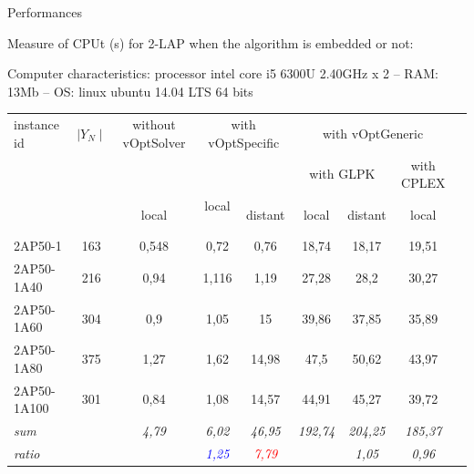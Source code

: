 \documentclass[10pt,xcolor=dvipsnames]{beamer}
\newcommand{\red}{\textcolor{red}}
\newcommand{\blue}{\textcolor{blue}}
\begin{document}
\begin{frame}{Performances}

\vspace{2mm}

Measure of CPUt (s) for 2-LAP when the algorithm is embedded or not:
\vspace{2mm}

{\tiny
Computer characteristics: processor intel core i5 6300U  2.40GHz  x 2 -- RAM: 13Mb -- OS: linux ubuntu 14.04 LTS 64 bits\\

\begin{center}
\begin{tabular}{| l | c || c | c | c | c | c | c | c |} 
   \hline
    instance id & $\mid Y_N \mid$ & without vOptSolver & \multicolumn{2}{c|}{with vOptSpecific} & \multicolumn{3}{c|}{with vOptGeneric} \\
    \cline{6-8}  
                      &&                                &  \multicolumn{2}{c|}{}                            & \multicolumn{2}{c|}{with GLPK} & \multicolumn{1}{c|}{with CPLEX}\\
                       \cline{3-8}                  
                      &&         local                & \quad local \quad \ & distant                                       & \quad local \quad & distant  & \quad local  \\
    \hline
    \hline    
2AP50-1	        & 163	&	0,548	&	0,72	&	0,76	&	18,74	&	18,17	&	19,51	\\
2AP50-1A40	& 216 &	0,94	&	1,116	&	1,19	&	27,28	&	28,2	&	30,27	\\
2AP50-1A60	& 304 &	0,9	&	1,05	&	15	&	39,86	&	37,85	&	35,89	\\
2AP50-1A80	& 375 &	1,27	&	1,62	&	14,98	&	47,5	&	50,62	&	43,97	\\
2AP50-1A100	& 301 &	0,84	&	1,08	&	14,57	&	44,91	&	45,27	&	39,72	\\
  \hspace{5mm} \textit{sum}    &        &    \textit{4,79}  &	\textit{6,02}  &	\textit{46,95}  & \textit{192,74} & \textit{204,25} & \textit{185,37} \\
  \hspace{5mm} \textit{ratio}     &        &             &     \textit{\blue{1,25}}	&      \textit{\red{7,79}}	 & 	           &   \textit{1,05}	& \textit{0,96}\\	 

\end{tabular}
\end{center}}
\end{frame}
\end{document}
